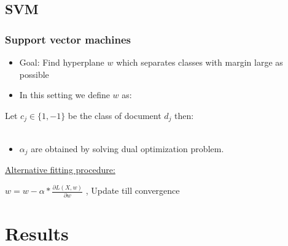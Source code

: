 \documentclass{beamer}
\begin{document}
\subsection{SVM}
\begin{frame}
	\frametitle{Support vector machines}
	\begin{itemize}
		\item Goal: Find hyperplane $w$ which separates classes with margin large as possible \pause
		\item In this setting we define $w$ as:
	\end{itemize}
	
	\begin{Definition}
		Let $c_j \in \{1,-1\}$ be the class of document $d_j$ then: \\
		 \\
	\end{Definition}
	\begin{itemize}
		\item $\alpha_{j}$ are obtained by solving dual optimization problem.
	\end{itemize}
	\pause
	\underline{Alternative fitting procedure:}
	\\
	\begin{Definition}
		\centering
		$w = w - \alpha * \frac{\partial L(X,w)}{\partial w} $ , Update till convergence
	\end{Definition}

\end{frame}
\fi

\section{Results}
\end{document}
